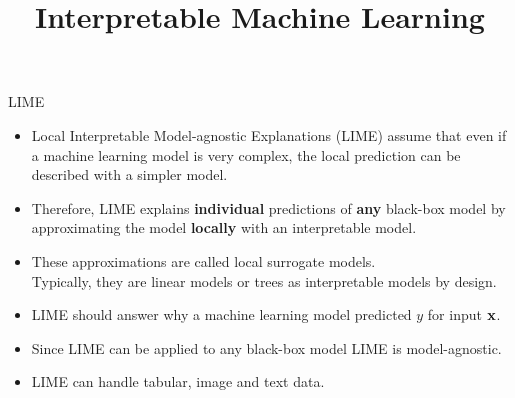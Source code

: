 \documentclass[11pt,compress,t,notes=noshow, aspectratio=169, xcolor=table]{beamer}
\title{Interpretable Machine Learning}
\date{}
\begin{document}
	




\newcommand{\titlefigure}{figure/lime5}
\newcommand{\learninggoals}{
	\item Understand motivation for LIME
	\item Develop a mathematical intuition
	\item See various applications}



\begin{vbframe}[c]{LIME}
\begin{itemize}
		\item Local Interpretable Model-agnostic Explanations (LIME) assume that even if a machine learning model is very complex, the local prediction can be described with a simpler model.
		\smallskip\pause
		\item  Therefore, LIME explains \textbf{individual} predictions of \textbf{any} black-box model by approximating the model \textbf{locally} with an interpretable model.
		\smallskip\pause
		\item These approximations are called local surrogate models. \\
		Typically, they are linear models or trees as interpretable models by design.
		\smallskip\pause
		\item LIME should answer why a machine learning model predicted $y$ for input $\xv$.
		\smallskip\pause
		\item Since LIME can be applied to any black-box model LIME is model-agnostic.  
		\smallskip\pause
		\item LIME can handle tabular, image and text data. 
\end{itemize}
\end{vbframe}
\end{document}
